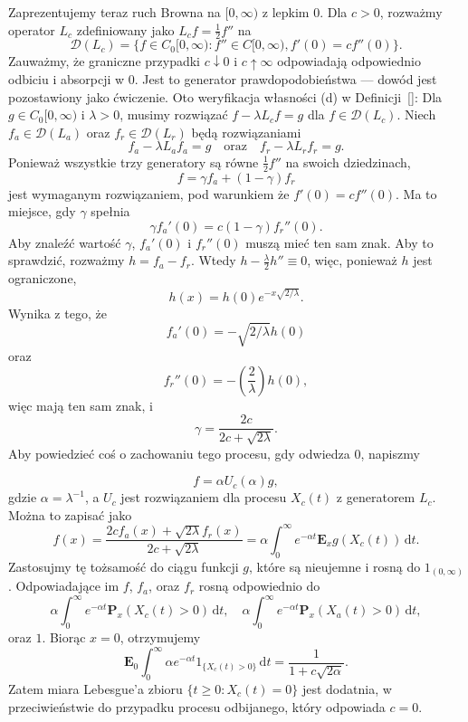 \documentclass{article}
\begin{document}
\begin{pd}
Zaprezentujemy teraz ruch Browna na $[0, \infty)$ z lepkim $0$. 
Dla $c > 0$, rozważmy operator $L_c$ zdefiniowany jako $L_c f = \frac{1}{2} f''$ na
\[
\mathcal{D}(L_c) = \{f \in C_0[0, \infty) : f'' \in C[0, \infty), f'(0) = c f''(0)\}.
\]
Zauważmy, że graniczne przypadki $c \downarrow 0$ i $c \uparrow \infty$ 
odpowiadają odpowiednio odbiciu i absorpcji w $0$. 
Jest to generator prawdopodobieństwa — dowód jest pozostawiony jako ćwiczenie.
Oto weryfikacja własności (d) w Definicji~\ref{}: 
Dla $g \in C_0[0, \infty)$ i $\lambda > 0$, 
musimy rozwiązać $f - \lambda L_c f = g$ dla $f \in \mathcal{D}(L_c)$. 
Niech $f_a \in \mathcal{D}(L_a)$ oraz $f_r \in \mathcal{D}(L_r)$ będą rozwiązaniami
\[
f_a - \lambda L_a f_a = g \quad \text{oraz} \quad f_r - \lambda L_r f_r = g.
\]
Ponieważ wszystkie trzy generatory są równe $\frac{1}{2} f''$ na swoich dziedzinach,
\[
f = \gamma f_a + (1 - \gamma) f_r
\]
jest wymaganym rozwiązaniem, pod warunkiem że $f'(0) = c f''(0)$. 
Ma to miejsce, gdy $\gamma$ spełnia
\[
\gamma f_a'(0) = c (1 - \gamma) f_r''(0).
\]
Aby znaleźć wartość $\gamma$, $f_a'(0)$ i $f_r''(0)$ muszą mieć ten sam znak. 
Aby to sprawdzić, rozważmy $h = f_a - f_r$. 
Wtedy $h - \frac{\lambda}{2} h'' \equiv 0$, więc, 
ponieważ $h$ jest ograniczone,
\[
	h(x) = h(0) e^{-x \sqrt{2/\lambda}}.
\]
Wynika z tego, że
\[
	f_a'(0) = -\sqrt{2/\lambda} h(0)
\]
oraz
\[
f_r''(0) = -\left(\frac{2}{\lambda}\right) h(0),
\]
więc mają ten sam znak, i
\[
\gamma = \frac{2c}{2c + \sqrt{2\lambda}}.
\]
Aby powiedzieć coś o zachowaniu tego procesu, gdy odwiedza 0, napiszmy

\[
f = \alpha U_c(\alpha) g,
\]
gdzie $\alpha = \lambda^{-1}$, a $U_c$ jest rozwiązaniem dla procesu $X_c(t)$ z generatorem $L_c$. 
Można to zapisać jako
\[
f(x) = \frac{2c f_a(x) + \sqrt{2\lambda} f_r(x)}{2c + \sqrt{2\lambda}} = \alpha \int_{0}^{\infty} e^{-\alpha t} \mathbf{E}_x 
g(X_c(t)) \,\mathrm{d}t.
\]
Zastosujmy tę tożsamość do ciągu funkcji $g$, które są nieujemne i rosną do $1_{(0, \infty)}$. 
Odpowiadające im $f$, $f_a$, oraz $f_r$ rosną odpowiednio do
\[
	\alpha \int_{0}^{\infty} e^{-\alpha t} \mathbf{P}_x(X_c(t) > 0) \,\mathrm{d}t, \quad 
	\alpha \int_{0}^{\infty} e^{-\alpha t} \mathbf{P}_x(X_a(t) > 0) \,\mathrm{d}t,
\]
oraz $1$. 
Biorąc $x = 0$, otrzymujemy
\[
	\mathbf{E}_0 \int_{0}^{\infty} \alpha e^{-\alpha t} 1_{\{X_c(t) > 0\}} \,\mathrm{d}t = 
	\frac{1}{1 + c\sqrt{2\alpha}}.
\]
Zatem miara Lebesgue'a zbioru $\{t \ge 0 : X_c(t) = 0\}$ jest dodatnia, w przeciwieństwie do przypadku procesu odbijanego, który odpowiada $c = 0$.
\end{pd}
\end{document}
